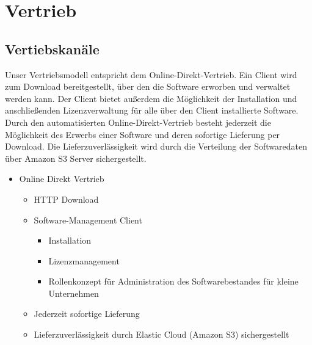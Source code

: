 \chapter{Vertrieb}
	\section{Vertiebskan\"ale}
	
Unser Vertriebsmodell entspricht dem Online-Direkt-Vertrieb. Ein Client wird zum Download bereitgestellt, über den die  Software erworben und verwaltet werden kann. Der Client bietet außerdem die Möglichkeit der Installation und anschließenden Lizenzverwaltung für alle über den Client installierte Software.  Durch den automatisierten Online-Direkt-Vertrieb besteht jederzeit die Möglichkeit des Erwerbs einer Software und deren sofortige Lieferung per Download. Die Lieferzuverlässigkeit wird durch die Verteilung der Softwaredaten über Amazon S3 Server sichergestellt.

	\begin{itemize}
		\item Online Direkt Vertrieb
		\begin{itemize}
			\item HTTP Download
			\item Software-Management Client
				\begin{itemize}
					\item Installation
					\item Lizenzmanagement
					\item Rollenkonzept f\"ur Administration des Softwarebestandes f\"ur kleine Unternehmen
				\end{itemize}
			\item Jederzeit sofortige Lieferung
			\item Lieferzuverlässigkeit durch Elastic Cloud (Amazon S3) sichergestellt
		\end{itemize}
	\end{itemize}
